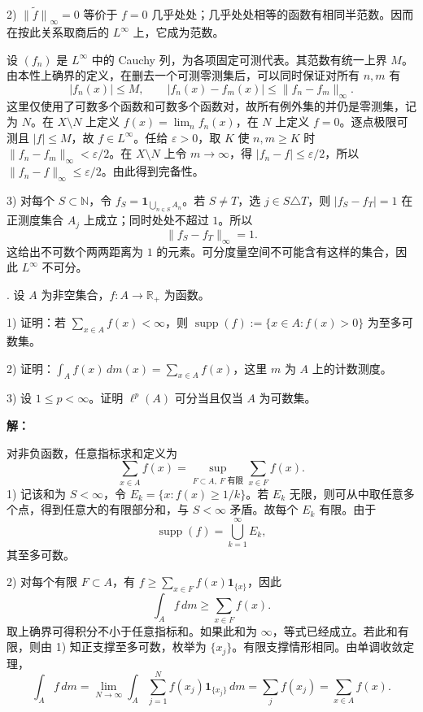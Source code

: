 \documentclass{article}
\begin{document}
2) $\widetilde{\|f\|}_\infty=0$ 等价于 $f=0$ 几乎处处；几乎处处相等的函数有相同半范数。因而在按此关系取商后的 $L^\infty$ 上，它成为范数。

设 $(f_n)$ 是 $L^\infty$ 中的 Cauchy 列，为各项固定可测代表。其范数有统一上界 $M$。由本性上确界的定义，在删去一个可测零测集后，可以同时保证对所有 $n,m$ 有
\[
|f_n(x)|\le M,\qquad |f_n(x)-f_m(x)|\le\|f_n-f_m\|_\infty.
\]
这里仅使用了可数多个函数和可数多个函数对，故所有例外集的并仍是零测集，记为 $N$。在 $X\setminus N$ 上定义 $f(x)=\lim_n f_n(x)$，在 $N$ 上定义 $f=0$。逐点极限可测且 $|f|\le M$，故 $f\in L^\infty$。任给 $\varepsilon>0$，取 $K$ 使 $n,m\ge K$ 时 $\|f_n-f_m\|_\infty<\varepsilon/2$。在 $X\setminus N$ 上令 $m\to\infty$，得 $|f_n-f|\le\varepsilon/2$，所以 $\|f_n-f\|_\infty\le\varepsilon/2$。由此得到完备性。

3) 对每个 $S\subset\mathbb N$，令 $f_S=\mathbf1_{\bigcup_{n\in S}A_n}$。若 $S\ne T$，选 $j\in S\triangle T$，则 $|f_S-f_T|=1$ 在正测度集合 $A_j$ 上成立；同时处处不超过 $1$。所以
\[
\|f_S-f_T\|_\infty=1.
\]
这给出不可数个两两距离为 $1$ 的元素。可分度量空间不可能含有这样的集合，因此 $L^\infty$ 不可分。


\par\medskip{}. 设 $A$ 为非空集合，$f:A\to\mathbb R_+$ 为函数。

1) 证明：若 $\sum_{x\in A}f(x)<\infty$，则 $\operatorname{supp}(f):=\{x\in A:f(x)>0\}$ 为至多可数集。

2) 证明：$\int_A f(x)\,dm(x)=\sum_{x\in A}f(x)$，这里 $m$ 为 $A$ 上的计数测度。

3) 设 $1\le p<\infty$。证明 $\ell^p(A)$ 可分当且仅当 $A$ 为可数集。


\par{}\noindent\textbf{解：}\par\nopagebreak[4]



对非负函数，任意指标求和定义为
\[
\sum_{x\in A}f(x)=\sup_{F\subset A,\ F\text{ 有限}}\sum_{x\in F}f(x).
\]
1) 记该和为 $S<\infty$，令 $E_k=\{x:f(x)\ge1/k\}$。若 $E_k$ 无限，则可从中取任意多个点，得到任意大的有限部分和，与 $S<\infty$ 矛盾。故每个 $E_k$ 有限。由于
\[
\operatorname{supp}(f)=\bigcup_{k=1}^\infty E_k,
\]
其至多可数。

2) 对每个有限 $F\subset A$，有 $f\ge\sum_{x\in F}f(x)\mathbf1_{\{x\}}$，因此
\[
\int_Af\,dm\ge\sum_{x\in F}f(x).
\]
取上确界可得积分不小于任意指标和。如果此和为 $\infty$，等式已经成立。若此和有限，则由 1) 知正支撑至多可数，枚举为 $\{x_j\}$。有限支撑情形相同。由单调收敛定理，
\[
\int_Af\,dm=\lim_{N\to\infty}\int_A\sum_{j=1}^Nf(x_j)\mathbf1_{\{x_j\}}\,dm
=\sum_jf(x_j)=\sum_{x\in A}f(x).
\]
\end{document}
